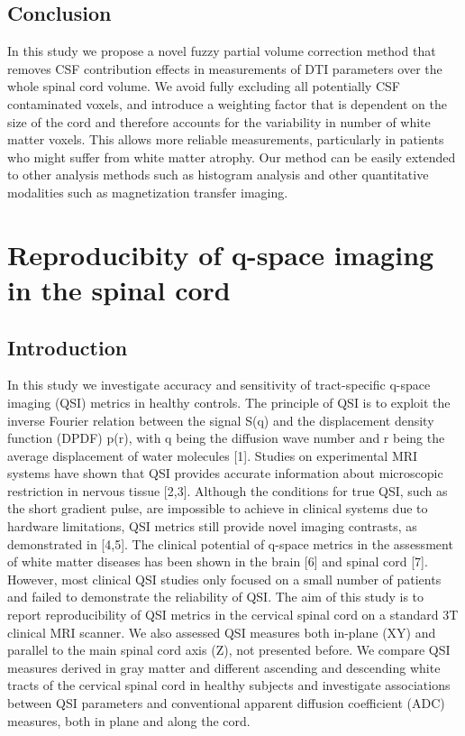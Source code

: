 \subsection*{Conclusion}
In this study we propose a novel fuzzy partial volume correction method that removes CSF contribution effects in measurements of DTI parameters over the whole spinal cord volume. We avoid fully excluding all potentially CSF contaminated voxels, and introduce a weighting factor that is dependent on the size of the cord and therefore accounts for the variability in number of white matter voxels. This allows more reliable measurements, particularly in patients who might suffer from white matter atrophy. Our method can be easily extended to other analysis methods such as histogram analysis and other quantitative modalities such as magnetization transfer imaging.

\section{Reproducibity of q-space imaging in the spinal cord}
\subsection*{Introduction}
In this study we investigate accuracy and sensitivity of tract-specific q-space imaging (QSI) metrics in healthy controls. The principle of QSI is to exploit the inverse Fourier relation between the signal S(q) and the displacement density function (DPDF) p(r), with q being the diffusion wave number and r being the average displacement of water molecules [1]. Studies on experimental MRI systems have shown that QSI provides accurate information about microscopic restriction in nervous tissue [2,3]. Although the conditions for true QSI, such as the short gradient pulse, are impossible to achieve in clinical systems due to hardware limitations, QSI metrics still provide novel imaging contrasts, as demonstrated in [4,5]. The clinical potential of q-space metrics in the assessment of white matter diseases has been shown in the brain [6] and spinal cord [7]. However, most clinical QSI studies only focused on a small number of patients and failed to demonstrate the reliability of QSI. The aim of this study is to report reproducibility of QSI metrics in the cervical spinal cord on a standard 3T clinical MRI scanner. We also assessed QSI measures both in-plane (XY) and parallel to the main spinal cord axis (Z), not presented before. We compare QSI measures derived in gray matter and different ascending and descending white tracts of the cervical spinal cord in healthy subjects and investigate associations between QSI parameters and conventional apparent diffusion coefficient (ADC) measures, both in plane and along the cord.                                          
